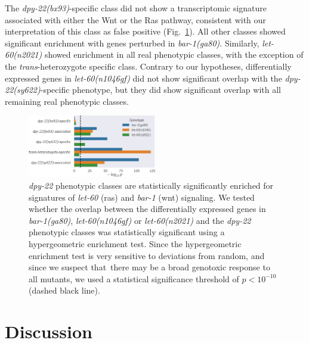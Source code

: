\documentclass[9pt,twocolumn,twoside]{gsajnl}
\newcommand{\gene}[1]{\mbox{\emph{#1}}}
\newcommand{\dpy}[1]{\gene{dpy-22#1}}
\newcommand{\bx}{\dpy{(bx93)}}
\newcommand{\sy}{\dpy{(sy622)}}
\begin{document}
The \bx{}-specific class did not show a transcriptomic signature associated with
either the Wnt or the Ras pathway, consistent with our interpretation of this
class as false positive (Fig.~\ref{fig:wnt_stps}). All other classes showed
significant enrichment with genes perturbed in \gene{bar-1(ga80)}. Similarly,
\gene{let-60(n2021)} showed enrichment in all real phenotypic classes, with the
exception of the \emph{trans}-heterozygote specific class. Contrary to our
hypotheses, differentially expressed genes in \gene{let-60(n1046gf)} did not
show significant overlap with the \sy{}-specific phenotype, but they did show
significant overlap with all remaining real phenotypic classes.

\begin{figure}
  \includegraphics[width=0.5\textwidth]{../figs/stp_pvals.pdf}
  \caption{
          \dpy{} phenotypic classes are statistically significantly enriched
          for signatures of \gene{let-60} (ras) and \gene{bar-1} (wnt)
          signaling.
          We tested whether the overlap between the differentially expressed
          genes in \gene{bar-1(ga80)}, \gene{let-60(n1046gf)} or
          \gene{let-60(n2021)} and the \dpy{} phenotypic classes was
          statistically significant using a hypergeometric enrichment test.
          Since the hypergeometric enrichment test is very sensitive to
          deviations from random, and since we suspect that there may be a broad
          genotoxic response to all mutants, we used a statistical significance
          threshold of $p < 10^{-10}$ (dashed black line).
  }
\label{fig:wnt_stps}
\end{figure}

\section*{Discussion}
\label{sec:conclusions}
\end{document}
